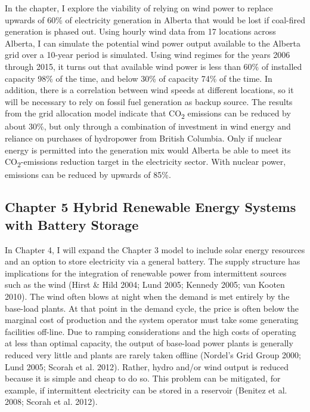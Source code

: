 \documentclass[10pt,letter]{article}
\begin{document}
In the chapter, I explore the viability of relying on wind power to
replace upwards of 60\% of electricity generation in Alberta that would
be lost if coal-fired generation is phased out. Using hourly wind data
from 17 locations across Alberta, I can simulate the potential wind
power output available to the Alberta grid over a 10-year period is
simulated. Using wind regimes for the years 2006 through 2015, it turns
out that available wind power is less than 60\% of installed capacity
98\% of the time, and below 30\% of capacity 74\% of the time. In
addition, there is a correlation between wind speeds at different
locations, so it will be necessary to rely on fossil fuel generation as
backup source. The results from the grid allocation model indicate that
CO\textsubscript{2} emissions can be reduced by about 30\%, but only
through a combination of investment in wind energy and reliance on
purchases of hydropower from British Columbia. Only if nuclear energy is
permitted into the generation mix would Alberta be able to meet its
CO\textsubscript{2}-emissions reduction target in the electricity
sector. With nuclear power, emissions can be reduced by upwards of 85\%.

\subsection{Chapter 5 Hybrid Renewable Energy Systems with Battery
Storage
}\label{chapter-5-hybrid-renewable-energy-systems-with-battery-storage}

In Chapter 4, I will expand the Chapter 3 model to include solar energy
resources and an option to store electricity via a general battery. The
supply structure has implications for the integration of renewable power
from intermittent sources such as the wind (Hirst \& Hild 2004; Lund
2005; Kennedy 2005; van Kooten 2010). The wind often blows at night when
the demand is met entirely by the base-load plants. At that point in the
demand cycle, the price is often below the marginal cost of production
and the system operator must take some generating facilities off-line.
Due to ramping considerations and the high costs of operating at less
than optimal capacity, the output of base-load power plants is generally
reduced very little and plants are rarely taken offline (Nordel's Grid
Group 2000; Lund 2005; Scorah et al. 2012). Rather, hydro and/or wind
output is reduced because it is simple and cheap to do so. This problem
can be mitigated, for example, if intermittent electricity can be stored
in a reservoir (Benitez et al. 2008; Scorah et al. 2012).
\end{document}
